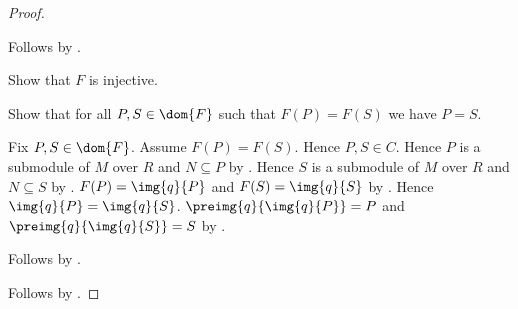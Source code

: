 \begin{proof}
\begin{subproof}
        Follows by .
    \end{subproof}
    Show that $F$ is injective.
    \begin{subproof}
        Show that for all $P,S\in\dom{F}$ such that $F(P)=F(S)$
            we have $P=S$.
        \begin{subproof}
            Fix $P,S\in\dom{F}$.
            Assume $F(P)=F(S)$.
            Hence $P,S\in C$.
            Hence $P$ is a submodule of $M$ over $R$ and
                $N\subseteq P$ by \auto.
            Hence $S$ is a submodule of $M$ over $R$ and
                $N\subseteq S$ by \auto.
            $F(P)=\img{q}{P}$ and $F(S)=\img{q}{S}$ by
                .
            Hence $\img{q}{P}=\img{q}{S}$.
            $\preimg{q}{\img{q}{P}}=P$ and
                $\preimg{q}{\img{q}{S}}=S$ by
                .
        \end{subproof}
        Follows by .
    \end{subproof}
    Follows by .
\end{proof}

